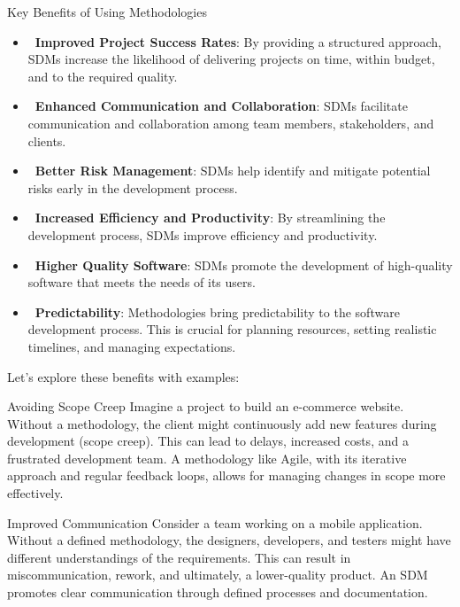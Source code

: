 \begin{highlightbox}{Key Benefits of Using Methodologies}
  \begin{itemize}
    \item \textbf{\faChartLine\ Improved Project Success Rates}: By providing a structured approach, SDMs increase the likelihood of delivering projects on time, within budget, and to the required quality.

    \item \textbf{\faComments\ Enhanced Communication and Collaboration}: SDMs facilitate communication and collaboration among team members, stakeholders, and clients.

    \item \textbf{\faShield*\ Better Risk Management}: SDMs help identify and mitigate potential risks early in the development process.

    \item \textbf{\faRocket\ Increased Efficiency and Productivity}: By streamlining the development process, SDMs improve efficiency and productivity.

    \item \textbf{\faStar\ Higher Quality Software}: SDMs promote the development of high-quality software that meets the needs of its users.

    \item \textbf{\faClock\ Predictability}: Methodologies bring predictability to the software development process. This is crucial for planning resources, setting realistic timelines, and managing expectations.
  \end{itemize}
\end{highlightbox}

Let's explore these benefits with examples:

\begin{examplebox}{Avoiding Scope Creep}
  Imagine a project to build an e-commerce website. Without a methodology, the client might continuously add new features during development (scope creep). This can lead to delays, increased costs, and a frustrated development team. A methodology like Agile, with its iterative approach and regular feedback loops, allows for managing changes in scope more effectively.
\end{examplebox}

\begin{examplebox}{Improved Communication}
  Consider a team working on a mobile application. Without a defined methodology, the designers, developers, and testers might have different understandings of the requirements. This can result in miscommunication, rework, and ultimately, a lower-quality product. An SDM promotes clear communication through defined processes and documentation.
\end{examplebox}

